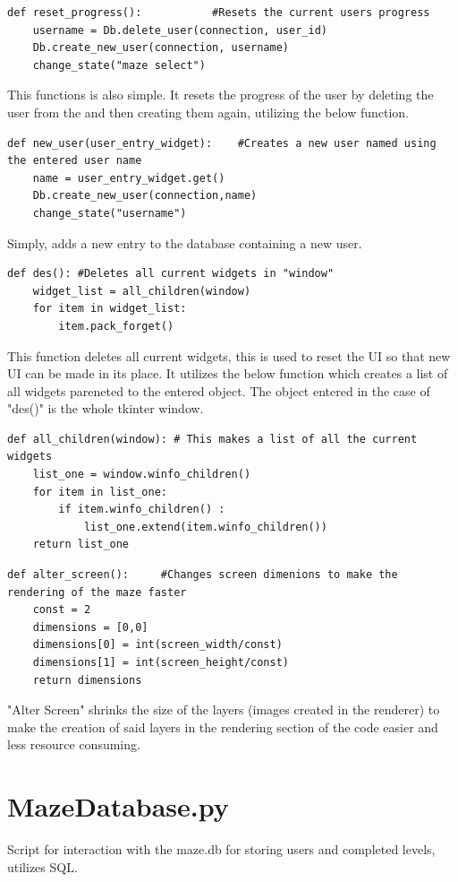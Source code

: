 \begin{lstlisting}
def reset_progress():           #Resets the current users progress
    username = Db.delete_user(connection, user_id)
    Db.create_new_user(connection, username)
    change_state("maze select")
\end{lstlisting}
This functions is also simple. It resets the progress of the user by deleting the user from the and then creating them again, utilizing the below function.

\begin{lstlisting}
def new_user(user_entry_widget):    #Creates a new user named using the entered user name
    name = user_entry_widget.get()
    Db.create_new_user(connection,name)
    change_state("username")
\end{lstlisting}
Simply, adds a new entry to the database containing a new user.

\clearpage

\begin{lstlisting}
def des(): #Deletes all current widgets in "window"
    widget_list = all_children(window)
    for item in widget_list:
        item.pack_forget()
\end{lstlisting}
This function deletes all current widgets, this is used to reset the UI so that new UI can be made in its place. It utilizes the below function
which creates a list of all widgets pareneted to the entered object. The object entered in the case of "des()"  is the whole tkinter window.
\begin{lstlisting}
def all_children(window): # This makes a list of all the current widgets
    list_one = window.winfo_children()
    for item in list_one:
        if item.winfo_children() :
            list_one.extend(item.winfo_children())
    return list_one
\end{lstlisting}

\begin{lstlisting}
def alter_screen():     #Changes screen dimenions to make the rendering of the maze faster
    const = 2
    dimensions = [0,0]
    dimensions[0] = int(screen_width/const)
    dimensions[1] = int(screen_height/const)
    return dimensions
\end{lstlisting}
"Alter Screen" shrinks the size of the layers (images created in the renderer) to make the creation of said layers in the rendering section of the code easier
and less resource consuming.


\clearpage
\section{MazeDatabase.py}
Script for interaction with the maze.db for storing users and completed levels, utilizes SQL.

